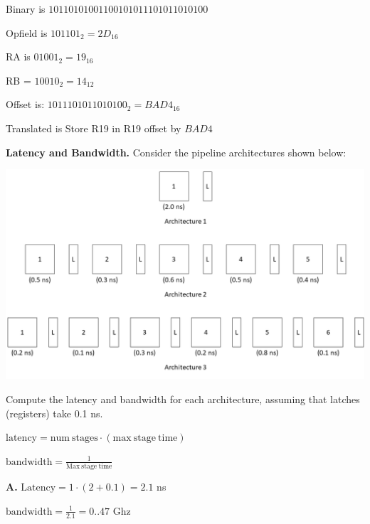 \documentclass{exam}
\begin{document}
\begin{questions}
Binary is $1011 0101 0011 0010 1011 1010 1101 0100$

Opfield is $1011 01_{2}=2D_{16}$

RA is $01 001_{2}=19_{16}$

RB = $1 0010_{2}=14_{12}$

Offset is: $1011 1010 1101 0100_{2}=BAD4_{16}$

Translated is Store R19 in R19 offset by $BAD4$

\question[12]
\textbf{Latency and Bandwidth.}
Consider the pipeline architectures shown below:
\begin{center}
\includegraphics[width=0.6\textwidth{}]{architecture.png}
\end{center}
Compute the latency and bandwidth for each architecture, assuming that latches (registers) take 0.1 ns. 


$\mathrm{latency}=\mathrm{num\ stages} \cdot (\mathrm{max\ stage\ time})$

$\mathrm{bandwidth} = \frac{1}{\mathrm{Max\ stage\ time}}$


\textbf{A.} $\mathrm{Latency}=1 \cdot (2+0.1)=2.1$ ns

$\mathrm{bandwidth} = \frac{1}{\mathrm{2.1}}=0..47$ Ghz



\end{questions}
\end{document}
